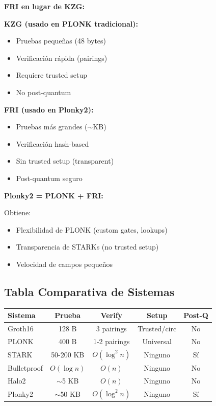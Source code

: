 \documentclass[11pt,a4paper,twoside,openright]{book}
\theoremstyle{definition}
\theoremstyle{plain}
\theoremstyle{remark}
\begin{document}
\begin{keyidea}
\textbf{FRI en lugar de KZG:}

\textbf{KZG (usado en PLONK tradicional):}
\begin{itemize}
    \item Pruebas pequeñas (48 bytes)
    \item Verificación rápida (pairings)
    \item Requiere trusted setup
    \item No post-quantum
\end{itemize}

\textbf{FRI (usado en Plonky2):}
\begin{itemize}
    \item Pruebas más grandes ($\sim$KB)
    \item Verificación hash-based
    \item Sin trusted setup (transparent)
    \item Post-quantum seguro
\end{itemize}

\textbf{Plonky2 = PLONK + FRI:}

Obtiene:
\begin{itemize}
    \item Flexibilidad de PLONK (custom gates, lookups)
    \item Transparencia de STARKs (no trusted setup)
    \item Velocidad de campos pequeños
\end{itemize}
\end{keyidea}

\subsection{Tabla Comparativa de Sistemas}

\begin{table}[htbp]
\centering
\begin{tabular}{lcccc}
\toprule
\textbf{Sistema} & \textbf{Prueba} & \textbf{Verify} & \textbf{Setup} & \textbf{Post-Q} \\
\midrule
Groth16 & 128 B & 3 pairings & Trusted/circ & No \\
PLONK & 400 B & 1-2 pairings & Universal & No \\
STARK & 50-200 KB & $O(\log^2 n)$ & Ninguno & Sí \\
Bulletproof & $O(\log n)$ & $O(n)$ & Ninguno & No \\
Halo2 & $\sim$5 KB & $O(n)$ & Ninguno & No \\
Plonky2 & $\sim$50 KB & $O(\log^2 n)$ & Ninguno & Sí \\
\bottomrule
\end{tabular}
\end{table}
\end{document}
